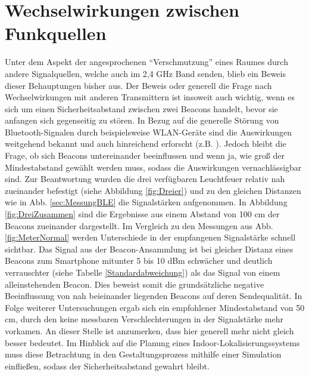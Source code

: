 \section{Wechselwirkungen zwischen Funkquellen} 
Unter dem Aspekt der angesprochenen "`Verschmutzung"' eines Raumes durch andere Signalquellen, welche auch im 2,4 GHz Band senden, blieb ein Beweis dieser Behauptungen bisher aus. Der Beweis oder generell die Frage nach Wechselwirkungen mit anderen Transmittern ist insoweit auch wichtig, wenn es sich um einen Sicherheitsabstand zwischen zwei Beacons handelt, bevor sie anfangen sich gegenseitig zu stören. In Bezug auf die generelle Störung von Bluetooth-Signalen durch beispielsweise WLAN-Geräte sind die Auswirkungen weitgehend bekannt und auch hinreichend erforscht (z.B. \cite{InterBLEWLAN}). Jedoch bleibt die Frage, ob sich Beacons untereinander beeinflussen und wenn ja, wie groß der Mindestabstand gewählt werden muss, sodass die Auswirkungen vernachlässigbar sind. Zur Beantwortung wurden die drei verfügbaren Leuchtfeuer relativ nah zueinander befestigt (siehe Abbildung \ref{fig:Dreier}) und zu den gleichen Distanzen wie in Abb. \ref{sec:MessungBLE} die Signalstärken aufgenommen. In Abbildung \ref{fig:DreiZusammen} sind die Ergebnisse aus einem Abstand von 100 cm der Beacons zueinander dargestellt. Im Vergleich zu den Messungen aus Abb. \ref{fig:MeterNormal} werden Unterschiede in der empfangenen Signalstärke schnell sichtbar. Das Signal aus der Beacon-Ansammlung ist bei gleicher Distanz eines Beacons zum Smartphone mitunter 5 bis 10 dBm schwächer und deutlich verrauschter (siehe Tabelle \ref{Standardabweichung}) als das Signal von einem alleinstehenden Beacon. Dies beweist somit die grundsätzliche negative Beeinflussung von nah beieinander liegenden Beacons auf deren Sendequalität. In Folge weiterer Untersuchungen ergab sich ein empfohlener Mindestabstand von 50 cm, durch den keine messbaren Verschlechterungen in der Signalstärke mehr vorkamen. An dieser Stelle ist anzumerken, dass hier generell mehr nicht gleich besser bedeutet. Im Hinblick auf die Planung eines Indoor-Lokalisierungssystems muss diese Betrachtung in den Gestaltungsprozess mithilfe einer Simulation einfließen, sodass der Sicherheitsabstand gewahrt bleibt.
